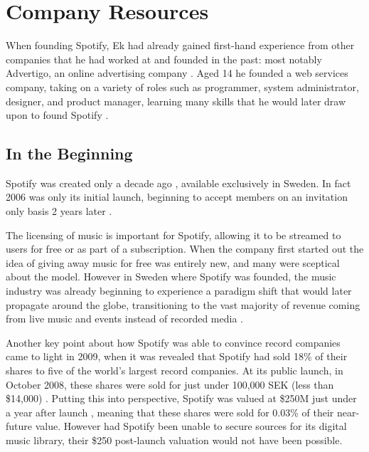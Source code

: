 \section{Company Resources}

When founding Spotify, Ek had already gained first-hand experience from other companies that he had worked at and founded in the past: most notably Advertigo, an online advertising company \parencite{Alexander2013}. Aged 14 he founded a web services company, taking on a variety of roles such as programmer, system administrator, designer, and product manager, learning many skills that he would later draw upon to found Spotify \parencite{wired_influencer}.

\subsection{In the Beginning} \label{resources:beginning}

Spotify was created only a decade ago \parencite{spotify_story_so_far, spotify_whois}, available exclusively in Sweden. In fact 2006 was only its initial launch, beginning to accept members on an invitation only basis 2 years later \parencite{spotify_story_so_far}.


The licensing of music is important for Spotify, allowing it to be streamed to users for free or as part of a subscription. When the company first started out the idea of giving away music for free was entirely new, and many were sceptical about the model. However in Sweden where Spotify was founded, the music industry was already beginning to experience a paradigm shift that would later propagate around the globe, transitioning to the vast majority of revenue coming from live music and events instead of recorded media \parencite{Johansson2009}.

Another key point about how Spotify was able to convince record companies came to light in 2009, when it was revealed that Spotify had sold 18\% of their shares to five of the world's largest record companies. At its public launch, in October 2008, these shares were sold for just under 100,000 SEK (less than \$14,000) \parencite{Jerrang2009}. Putting this into perspective, Spotify was valued at \$250M just under a year after launch \parencite{Arrington2009}, meaning that these shares were sold for 0.03\% of their near-future value. However had Spotify been unable to secure sources for its digital music library, their \$250 post-launch valuation would not have been possible.

